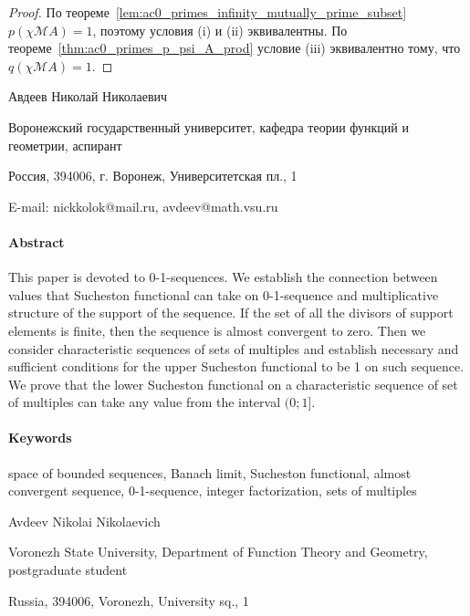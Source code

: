 \documentclass[a4paper,openbib]{article}
\theoremstyle{definition}
\begin{document}
\begin{proof}
	По теореме~\ref{lem:ac0_primes_infinity_mutually_prime_subset} $p(\chi\mathscr{M}A)=1$,
	поэтому условия (i) и (ii) эквивалентны.
	По теореме~\ref{thm:ac0_primes_p_psi_A_prod} условие (iii) эквивалентно тому, что $q(\chi\mathscr{M}A)=1$.
\end{proof}

Авдеев Николай Николаевич

Воронежский государственный университет, кафедра теории функций и геометрии, аспирант

Россия, 394006, г. Воронеж, Университетская пл., 1

E-mail: nickkolok@mail.ru, avdeev@math.vsu.ru


\paragraph{Abstract}

This paper is devoted to 0-1-sequences.
We establish the connection between values that Sucheston functional can take
on 0-1-sequence and multiplicative structure of the support of the sequence.
If the set of all the divisors of support elements is finite,
then the sequence is almost convergent to zero.
Then we consider characteristic sequences of sets of multiples
and establish necessary and sufficient conditions
for the upper Sucheston functional
to be 1 on such sequence.
We prove that the lower Sucheston functional
on a characteristic sequence of set of multiples can take any value from the interval $(0;1]$.

\paragraph{Keywords}
	space of bounded sequences,
	Banach limit,
	Sucheston functional,
	almost convergent sequence,
	0-1-sequence,
	integer factorization,
	sets of multiples


Avdeev Nikolai Nikolaevich

Voronezh State University, Department of Function Theory and Geometry, postgraduate student

Russia, 394006, Voronezh, University sq., 1


\printbibliography{}

\printbibitembibliography{}
\end{document}
